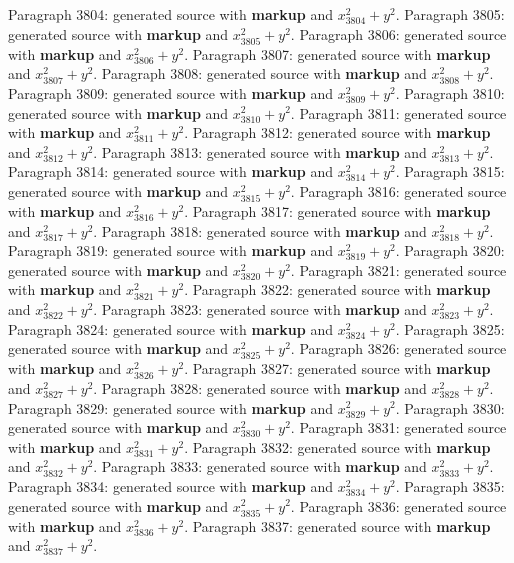 \documentclass{article}
\begin{document}
Paragraph 3804: generated source with \textbf{markup} and $x_{3804}^2 + y^2$.
Paragraph 3805: generated source with \textbf{markup} and $x_{3805}^2 + y^2$.
Paragraph 3806: generated source with \textbf{markup} and $x_{3806}^2 + y^2$.
Paragraph 3807: generated source with \textbf{markup} and $x_{3807}^2 + y^2$.
Paragraph 3808: generated source with \textbf{markup} and $x_{3808}^2 + y^2$.
Paragraph 3809: generated source with \textbf{markup} and $x_{3809}^2 + y^2$.
Paragraph 3810: generated source with \textbf{markup} and $x_{3810}^2 + y^2$.
Paragraph 3811: generated source with \textbf{markup} and $x_{3811}^2 + y^2$.
Paragraph 3812: generated source with \textbf{markup} and $x_{3812}^2 + y^2$.
Paragraph 3813: generated source with \textbf{markup} and $x_{3813}^2 + y^2$.
Paragraph 3814: generated source with \textbf{markup} and $x_{3814}^2 + y^2$.
Paragraph 3815: generated source with \textbf{markup} and $x_{3815}^2 + y^2$.
Paragraph 3816: generated source with \textbf{markup} and $x_{3816}^2 + y^2$.
Paragraph 3817: generated source with \textbf{markup} and $x_{3817}^2 + y^2$.
Paragraph 3818: generated source with \textbf{markup} and $x_{3818}^2 + y^2$.
Paragraph 3819: generated source with \textbf{markup} and $x_{3819}^2 + y^2$.
Paragraph 3820: generated source with \textbf{markup} and $x_{3820}^2 + y^2$.
Paragraph 3821: generated source with \textbf{markup} and $x_{3821}^2 + y^2$.
Paragraph 3822: generated source with \textbf{markup} and $x_{3822}^2 + y^2$.
Paragraph 3823: generated source with \textbf{markup} and $x_{3823}^2 + y^2$.
Paragraph 3824: generated source with \textbf{markup} and $x_{3824}^2 + y^2$.
Paragraph 3825: generated source with \textbf{markup} and $x_{3825}^2 + y^2$.
Paragraph 3826: generated source with \textbf{markup} and $x_{3826}^2 + y^2$.
Paragraph 3827: generated source with \textbf{markup} and $x_{3827}^2 + y^2$.
Paragraph 3828: generated source with \textbf{markup} and $x_{3828}^2 + y^2$.
Paragraph 3829: generated source with \textbf{markup} and $x_{3829}^2 + y^2$.
Paragraph 3830: generated source with \textbf{markup} and $x_{3830}^2 + y^2$.
Paragraph 3831: generated source with \textbf{markup} and $x_{3831}^2 + y^2$.
Paragraph 3832: generated source with \textbf{markup} and $x_{3832}^2 + y^2$.
Paragraph 3833: generated source with \textbf{markup} and $x_{3833}^2 + y^2$.
Paragraph 3834: generated source with \textbf{markup} and $x_{3834}^2 + y^2$.
Paragraph 3835: generated source with \textbf{markup} and $x_{3835}^2 + y^2$.
Paragraph 3836: generated source with \textbf{markup} and $x_{3836}^2 + y^2$.
Paragraph 3837: generated source with \textbf{markup} and $x_{3837}^2 + y^2$.
\end{document}
